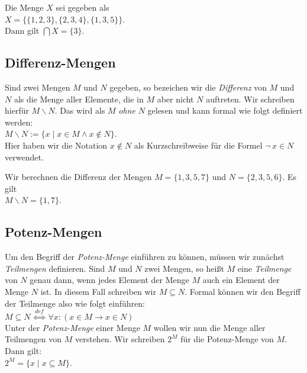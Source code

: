 \example
Die Menge $X$ sei gegeben als
\\[0.2cm]
\hspace*{1.3cm}
$X = \bigl\{ \{ 1, 2, 3 \}, \{ 2, 3, 4 \}, \{ 1, 3, 5 \} \bigr\}$. 
\\[0.2cm]
Dann gilt $\bigcap X = \{ 3 \}$.  \eox

\subsection{Differenz-Mengen}
 Sind zwei Mengen $M$ und $N$ gegeben, so bezeichen wir die \emph{Differenz} von
 $M$ und $N$ als die Menge aller Elemente, die in $M$ aber nicht $N$
 auftreten.  Wir schreiben hierfür $M \backslash N$.  Das wird als $M$ \emph{ohne} $N$
gelesen und kann formal wie folgt definiert werden: 
\\[0.2cm]
\hspace*{1.3cm} $M \backslash N := \{ x \mid x \in M \wedge x \not\in N \}$. 
\\[0.2cm]
Hier haben wir die Notation $x \not\in N$ als Kurzschreibweise für die Formel $\neg\, x \in N$ 
verwendet.
\pagebreak


\example
Wir berechnen die Differenz der Mengen $M = \{ 1, 3, 5, 7 \}$ und $N = \{ 2, 3, 5, 6 \}$.  Es gilt
\\[0.2cm]
\hspace*{1.3cm}
$M \backslash N = \{ 1, 7 \}$. \eox


\subsection{Potenz-Mengen}
Um den Begriff der \emph{Potenz-Menge} einführen zu können, müssen wir zunächst 
\emph{Teilmengen} definieren.  Sind $M$ und $N$ zwei Mengen, so heißt $M$ eine
\emph{Teilmenge} von $N$ genau dann, wenn jedes Element der Menge $M$ auch ein Element der
Menge $N$ ist.  In diesem Fall schreiben wir $M \subseteq N$.  Formal können wir den
Begriff der Teilmenge also wie folgt einführen: \\[0.2cm]
\hspace*{1.3cm} $M \subseteq N \;\stackrel{de\!f}{\Longleftrightarrow}\; \forall x: (x \in M \rightarrow x \in N)$ \\[0.2cm]
Unter der \emph{Potenz-Menge} einer Menge $M$ wollen wir nun die Menge aller Teilmengen
von $M$ verstehen.  Wir schreiben $2^M$ für die Potenz-Menge von $M$.  Dann gilt: \\[0.2cm]
\hspace*{1.3cm} $2^M = \{ x \;|\; x \subseteq M \}$.

